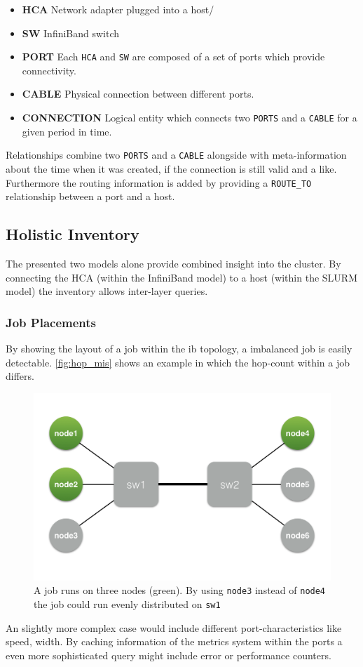 \begin{itemize}
    \item \textbf{HCA} Network adapter plugged into a host/
    \item \textbf{SW} InfiniBand switch
    \item \textbf{PORT} Each \lstinline{HCA} and \lstinline{SW} are composed of a set of ports which provide connectivity.
    \item \textbf{CABLE} Physical connection between different ports.
    \item \textbf{CONNECTION} Logical entity which connects two \lstinline{PORTS} and a \lstinline{CABLE} for a given period in time.
\end{itemize}

Relationships combine two \lstinline{PORTS} and a \lstinline{CABLE} alongside with meta-information about the time when it was created, if the connection is still valid and a like.
Furthermore the routing information is added by providing a \lstinline{ROUTE_TO} relationship between a port and a host.

\subsection{Holistic Inventory}
The presented two models alone provide combined insight into the cluster. By connecting the HCA (within the InfiniBand model) to a host (within the SLURM model) the inventory allows inter-layer queries.

\subsubsection{Job Placements}
By showing the layout of a job within the \gls{ib} topology, a imbalanced job is easily detectable. \autoref{fig:hop_mis} shows an example in which the hop-count within a job differs.
\begin{figure}[!ht]
    \includegraphics[width=.4\textwidth]{images/png/hop_missmatch.png}
    \caption{\label{fig:hop_mis}A job runs on three nodes (green). By using \lstinline{node3} instead of \lstinline{node4} the job could run evenly distributed on \lstinline{sw1}}
\end{figure}
An slightly more complex case would include different port-characteristics like speed, width.
By caching information of the metrics system within the ports a even more sophisticated query might include error or performance counters.

